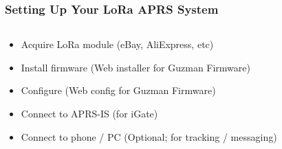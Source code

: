 \documentclass[aspectratio=169]{beamer}
\begin{document}
\begin{frame}[t]
  \frametitle{Setting Up Your LoRa APRS System}
  \begin{columns}
    \begin{column}{0.66\textwidth}
      \begin{itemize}
        \item Acquire LoRa module (eBay, AliExpress, etc)
        \medskip
        \item Install firmware (Web installer for Guzman Firmware)
        \medskip
        \item Configure (Web config for Guzman Firmware)
        \medskip
        \item Connect to APRS-IS (for iGate)
        \medskip
        \item Connect to phone / PC (Optional; for tracking / messaging)
      \end{itemize}
    \end{column}
    \begin{column}{0.33\textwidth}
    \end{column}
  \end{columns}
\end{frame}
\end{document}
